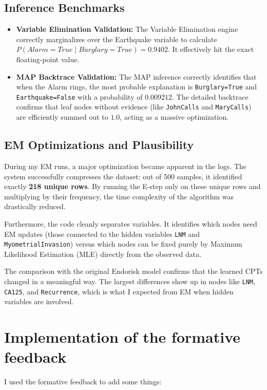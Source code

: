 \documentclass[11pt,a4paper]{article}
\begin{document}
\subsection{Inference Benchmarks}
\begin{itemize}
    \item \textbf{Variable Elimination Validation:} The Variable Elimination engine correctly marginalizes over the Earthquake variable to calculate $P(Alarm=True \mid Burglary=True) = 0.9402$. It effectively hit the exact floating-point value.
    \item \textbf{MAP Backtrace Validation:} The MAP inference correctly identifies that when the Alarm rings, the most probable explanation is \texttt{Burglary=True} and \texttt{Earthquake=False} with a probability of $0.009212$. The detailed backtrace confirms that leaf nodes without evidence (like \texttt{JohnCalls} and \texttt{MaryCalls}) are efficiently summed out to $1.0$, acting as a massive optimization.
\end{itemize}

\subsection{EM Optimizations and Plausibility}
During my EM runs, a major optimization became apparent in the logs. The system successfully compresses the dataset: out of 500 samples, it identified exactly \textbf{218 unique rows}. By running the E-step only on these unique rows and multiplying by their frequency, the time complexity of the algorithm was drastically reduced.

Furthermore, the code cleanly separates variables. It identifies which nodes need EM updates (those connected to the hidden variables \texttt{LNM} and \texttt{MyometrialInvasion}) versus which nodes can be fixed purely by Maximum Likelihood Estimation (MLE) directly from the observed data.

The comparison with the original Endorisk model confirms that the learned CPTs changed in a meaningful way. The largest differences show up in nodes like \texttt{LNM}, \texttt{CA125}, and \texttt{Recurrence}, which is what I expected from EM when hidden variables are involved.

\section{Implementation of the formative feedback}
I used the formative feedback to add some things:
\end{document}
